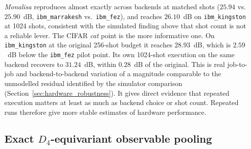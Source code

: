 \documentclass[pdflatex,sn-basic]{sn-jnl}
\begin{document}
\textit{Monalisa} reproduces almost exactly across backends at matched shots ($25.94$ vs.\ $25.90$~dB, \texttt{ibm\_marrakesh} vs.\ \texttt{ibm\_fez}), and reaches $26.10$~dB on \texttt{ibm\_kingston} at 1024 shots, consistent with the simulated finding above that shot count is not a reliable lever.
The CIFAR \textit{cat} point is the more informative one.
On \texttt{ibm\_kingston} at the original 256-shot budget it reaches $28.93$~dB, which is $2.59$~dB below the \texttt{ibm\_fez} pilot point.
Its own 1024-shot execution on the same backend recovers to $31.24$~dB, within $0.28$~dB of the original.
This is real job-to-job and backend-to-backend variation of a magnitude comparable to the unmodelled residual identified by the simulator comparison (Section~\ref{sec:hardware_robustness}).
It gives direct evidence that repeated execution matters at least as much as backend choice or shot count.
Repeated runs therefore give more stable estimates of hardware performance.

\subsection{Exact \texorpdfstring{$D_4$}{D4}-equivariant observable pooling}
\label{sec:d4}
\label{sec:symmetry}
\end{document}
